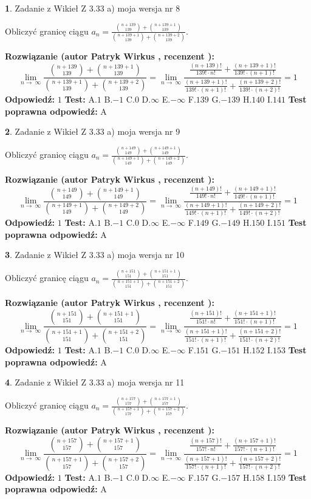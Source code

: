 \documentclass[12pt, a4paper]{article}
\theoremstyle{definition} %
\newtheorem{zad}{}
\newcommand{\zadStart}[1]{\begin{zad}#1\newline}
\newcommand{\zadStop}{\end{zad}}
\newcommand{\rozwStart}[2]{\noindent \textbf{Rozwiązanie (autor #1 , recenzent #2): }\newline}
\newcommand{\rozwStop}{\newline}
\newcommand{\odpStart}{\noindent \textbf{Odpowiedź:}\newline}
\newcommand{\odpStop}{\newline}
\newcommand{\testStart}{\noindent \textbf{Test:}\newline}
\newcommand{\testStop}{\newline}
\newcommand{\kluczStart}{\noindent \textbf{Test poprawna odpowiedź:}\newline}
\newcommand{\kluczStop}{\newline}
\begin{document}
\zadStart{Zadanie z Wikieł Z 3.33 a) moja wersja nr 8}

Obliczyć granicę ciągu $a_{n}=\frac{{n+139\choose139}+{n+139+1\choose139}}{{n+139+1\choose139}+{n+139+2\choose139}}$.
\zadStop
\rozwStart{Patryk Wirkus}{}
$$\lim\limits_{n\to\ \infty}\frac{{n+139\choose139}+{n+139+1\choose139}}{{n+139+1\choose139}+{n+139+2\choose139}} = \lim\limits_{n\to\ \infty}\frac{\frac{(n+139)!}{139! \cdot n!}+\frac{(n+139+1)!}{139! \cdot (n+1)!}}{\frac{(n+139+1)!}{139! \cdot (n+1)!}+\frac{(n+139+2)!}{139! \cdot (n+2)!}} = 1$$
\rozwStop
\odpStart
$1$
\odpStop
\testStart
A.$1$ B.$-1$ C.$0$ D.$\infty$ E.$-\infty$
F.$139$ G.$-139$
H.$140$
I.$141$
\testStop
\kluczStart
A
\kluczStop



\zadStart{Zadanie z Wikieł Z 3.33 a) moja wersja nr 9}

Obliczyć granicę ciągu $a_{n}=\frac{{n+149\choose149}+{n+149+1\choose149}}{{n+149+1\choose149}+{n+149+2\choose149}}$.
\zadStop
\rozwStart{Patryk Wirkus}{}
$$\lim\limits_{n\to\ \infty}\frac{{n+149\choose149}+{n+149+1\choose149}}{{n+149+1\choose149}+{n+149+2\choose149}} = \lim\limits_{n\to\ \infty}\frac{\frac{(n+149)!}{149! \cdot n!}+\frac{(n+149+1)!}{149! \cdot (n+1)!}}{\frac{(n+149+1)!}{149! \cdot (n+1)!}+\frac{(n+149+2)!}{149! \cdot (n+2)!}} = 1$$
\rozwStop
\odpStart
$1$
\odpStop
\testStart
A.$1$ B.$-1$ C.$0$ D.$\infty$ E.$-\infty$
F.$149$ G.$-149$
H.$150$
I.$151$
\testStop
\kluczStart
A
\kluczStop



\zadStart{Zadanie z Wikieł Z 3.33 a) moja wersja nr 10}

Obliczyć granicę ciągu $a_{n}=\frac{{n+151\choose151}+{n+151+1\choose151}}{{n+151+1\choose151}+{n+151+2\choose151}}$.
\zadStop
\rozwStart{Patryk Wirkus}{}
$$\lim\limits_{n\to\ \infty}\frac{{n+151\choose151}+{n+151+1\choose151}}{{n+151+1\choose151}+{n+151+2\choose151}} = \lim\limits_{n\to\ \infty}\frac{\frac{(n+151)!}{151! \cdot n!}+\frac{(n+151+1)!}{151! \cdot (n+1)!}}{\frac{(n+151+1)!}{151! \cdot (n+1)!}+\frac{(n+151+2)!}{151! \cdot (n+2)!}} = 1$$
\rozwStop
\odpStart
$1$
\odpStop
\testStart
A.$1$ B.$-1$ C.$0$ D.$\infty$ E.$-\infty$
F.$151$ G.$-151$
H.$152$
I.$153$
\testStop
\kluczStart
A
\kluczStop



\zadStart{Zadanie z Wikieł Z 3.33 a) moja wersja nr 11}

Obliczyć granicę ciągu $a_{n}=\frac{{n+157\choose157}+{n+157+1\choose157}}{{n+157+1\choose157}+{n+157+2\choose157}}$.
\zadStop
\rozwStart{Patryk Wirkus}{}
$$\lim\limits_{n\to\ \infty}\frac{{n+157\choose157}+{n+157+1\choose157}}{{n+157+1\choose157}+{n+157+2\choose157}} = \lim\limits_{n\to\ \infty}\frac{\frac{(n+157)!}{157! \cdot n!}+\frac{(n+157+1)!}{157! \cdot (n+1)!}}{\frac{(n+157+1)!}{157! \cdot (n+1)!}+\frac{(n+157+2)!}{157! \cdot (n+2)!}} = 1$$
\rozwStop
\odpStart
$1$
\odpStop
\testStart
A.$1$ B.$-1$ C.$0$ D.$\infty$ E.$-\infty$
F.$157$ G.$-157$
H.$158$
I.$159$
\testStop
\kluczStart
A
\kluczStop
\end{document}
